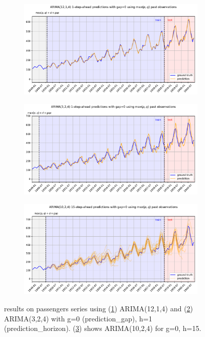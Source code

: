 \documentclass{article}
\begin{document}
\begin{figure}
  \centering
  \begin{subfigure}{\textwidth}
    \centering
    \includegraphics[scale=0.33]{figures/fig4}
    \caption{}
    \label{fig:f4}
  \end{subfigure}

  \begin{subfigure}{\textwidth}
    \centering
    \includegraphics[scale=0.33]{figures/fig5}
    \caption{}
    \label{fig:f5}
  \end{subfigure}

  \begin{subfigure}{\textwidth}
    \centering
    \includegraphics[scale=0.33]{figures/fig6}
    \caption{}
    \label{fig:f6}
  \end{subfigure}

  \caption{results on passengers series using (\ref{fig:f4}) ARIMA(12,1,4) and (\ref{fig:f5}) ARIMA(3,2,4) with g=0 ({\selectfont prediction\_gap}), h=1 ({\selectfont prediction\_horizon}). (\ref{fig:f6}) shows ARIMA(10,2,4) for g=0, h=15.}
  \label{fig:fig2}
\end{figure}
\end{document}
